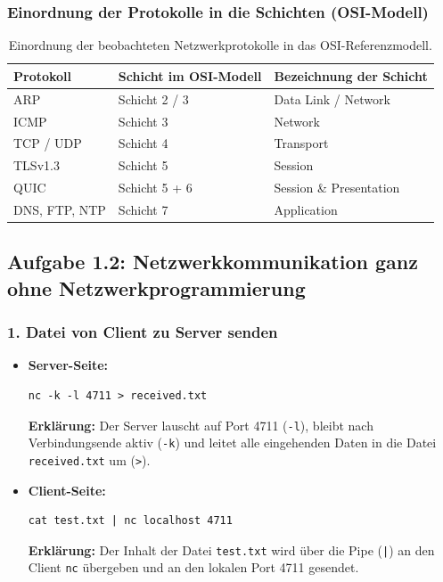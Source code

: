 \documentclass[12pt,a4paper,oneside]{article}
\begin{document}
        \subsubsection*{Einordnung der Protokolle in die Schichten (OSI-Modell)}

            \begin{table}[h!]
                \centering
                \renewcommand{\arraystretch}{1.15}
                \begin{tabularx}{\textwidth}{l l X}
                \toprule
                \textbf{Protokoll} & \textbf{Schicht im OSI-Modell} & \textbf{Bezeichnung der Schicht} \\
                \midrule
                ARP & Schicht 2 / 3 & Data Link / Network \\
                ICMP & Schicht 3 & Network \\
                TCP / UDP & Schicht 4 & Transport \\
                TLSv1.3 & Schicht 5 & Session \\
                QUIC & Schicht 5 + 6 & Session \& Presentation \\
                DNS, FTP, NTP & Schicht 7 & Application \\
                \bottomrule
                \end{tabularx}
                \caption{Einordnung der beobachteten Netzwerkprotokolle in das OSI-Referenzmodell.}
            \end{table}

    \subsection*{Aufgabe 1.2: Netzwerkkommunikation ganz ohne Netzwerkprogrammierung}

        \subsubsection*{1. Datei von Client zu Server senden}
            \begin{itemize}
                \item \textbf{Server-Seite:}
                \begin{lstlisting}
nc -k -l 4711 > received.txt
                \end{lstlisting}
            \textbf{Erklärung:} Der Server lauscht auf Port 4711 (\texttt{-l}), bleibt nach Verbindungsende aktiv (\texttt{-k}) und leitet alle eingehenden Daten in die Datei \texttt{received.txt} um (\texttt{>}).

            \item \textbf{Client-Seite:}
                \begin{lstlisting}
cat test.txt | nc localhost 4711
                \end{lstlisting}
            \textbf{Erklärung:} Der Inhalt der Datei \texttt{test.txt} wird über die Pipe (\texttt{|}) an den Client \texttt{nc} übergeben und an den lokalen Port 4711 gesendet.
        \end{itemize}
\end{document}
